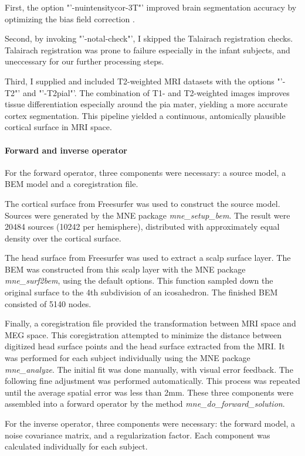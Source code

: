 First, the option "'-nuintensitycor-3T"' improved brain segmentation accuracy by optimizing the bias field correction \cite{3.3.nuintensity}.

Second, by invoking "'-notal-check"', I skipped the Talairach registration checks.
Talairach registration was prone to failure especially in the infant subjects, and uneccessary for our further processing steps.

Third, I supplied and included T2-weighted MRI datasets with the options "'-T2"' and "'-T2pial"'.
The combination of T1- and T2-weighted images improves tissue differentiation especially around the pia mater, yielding a more accurate cortex segmentation.
This pipeline yielded a continuous, antomically plausible cortical surface in MRI space.


\paragraph{Forward and inverse operator}
For the forward operator, three components were necessary: a source model, a BEM model and a coregistration file.

The cortical surface from Freesurfer was used to construct the source model.
Sources were generated by the MNE package \emph{mne\_setup\_bem}.
The result were 20484 sources (10242 per hemisphere), distributed with approximately equal density over the cortical surface.

The head surface from Freesurfer was used to extract a scalp surface layer.
The BEM was constructed from this scalp layer with the MNE package \emph{mne\_surf2bem}, using the default options.
This function sampled down the original surface to the 4th subdivision of an icosahedron.
The finished BEM consisted of 5140 nodes.

Finally, a coregistration file provided the transformation between MRI space and MEG space.
This coregistration attempted to minimize the distance between digitized head surface points and the head surface extracted from the MRI. 
It was performed for each subject individually using the MNE package \emph{mne\_analyze}.
The initial fit was done manually, with visual error feedback.
The following fine adjustment was performed automatically.
This process was repeated until the average spatial error was less than 2mm.
These three components were assembled into a forward operator by the method \emph{mne\_do\_forward\_solution}.


For the inverse operator, three components were necessary: the forward model, a noise covariance matrix, and a regularization factor.
Each component was calculated individually for each subject.

